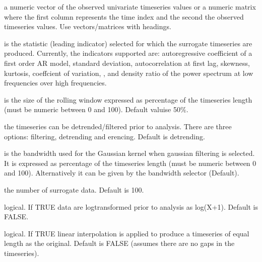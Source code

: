 \documentclass[a4paper]{book}
\begin{document}
\begin{Arguments}
\begin{ldescription}
\item[\code{timeseries}] a numeric vector of the observed
univariate timeseries values or a numeric matrix where
the first column represents the time index and the second
the observed timeseries values. Use vectors/matrices with
headings.

\item[\code{indicator}] is the statistic (leading indicator)
selected for which the surrogate timeseries are produced.
Currently, the indicators supported are: 
autoregressive coefficient of a first order AR model,
 standard deviation,  autocorrelation
at first lag,  skewness,  kurtosis,
 coeffcient of variation, , and
 density ratio of the power spectrum at
low frequencies over high frequencies.

\item[\code{winsize}] is the size of the rolling window
expressed as percentage of the timeseries length (must be
numeric between 0 and 100). Default valuise 50\%.

\item[\code{detrending}] the timeseries can be
detrended/filtered prior to analysis. There are three
options:  filtering, 
detrending and erencing. Default is
 detrending.

\item[\code{bandwidth}] is the bandwidth used for the Gaussian
kernel when gaussian filtering is selected. It is
expressed as percentage of the timeseries length (must be
numeric between 0 and 100). Alternatively it can be given
by the bandwidth selector 
(Default).

\item[\code{boots}] the number of surrogate data. Default is
100.

\item[\code{logtransform}] logical. If TRUE data are
logtransformed prior to analysis as log(X+1). Default is
FALSE.

\item[\code{interpolate}] logical. If TRUE linear interpolation
is applied to produce a timeseries of equal length as the
original. Default is FALSE (assumes there are no gaps in
the timeseries).
\end{ldescription}
\end{Arguments}
\end{document}
